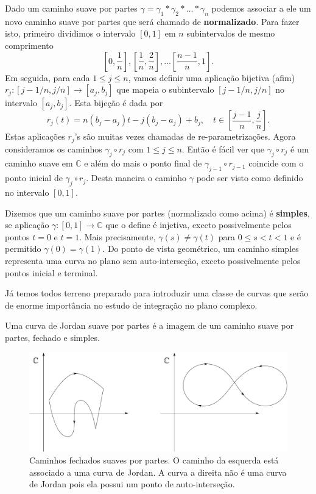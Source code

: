 Dado um caminho suave por partes $\gamma= \gamma_1*\gamma_2*\ldots*\gamma_n$
podemos associar a ele um novo caminho suave por partes 
que será chamado de {\bf normalizado}.
Para fazer isto, primeiro dividimos o intervalo $[0,1]$ em $n$ subintervalos de
mesmo comprimento
\[
\left[0,\frac{1}{n} \right],
\left[\frac{1}{n},\frac{2}{n} \right],
\ldots
\left[\frac{n-1}{n},1 \right].
\]
Em seguida, para cada $1\leqslant j\leqslant n$, vamos definir uma aplicação bijetiva (afim) 
$r_{j}:[j-1/n,j/n]\to [a_j,b_j]$ que mapeia o subintervalo $[j-1/n,j/n]$ no intervalo $[a_j,b_j]$. 
Esta bijeção é dada por 
\[
r_j(t) = n(b_j-a_j)t-j(b_j-a_j)+b_j, \quad t\in\left[\frac{j-1}{n},\frac{j}{n}\right].
\]
Estas aplicações $r_j$'s são muitas vezes chamadas de re-parametrizações. 
Agora consideramos os caminhos $\gamma_{j}\circ r_j$ com $1\leqslant j\leqslant n$.
Então é fácil ver que $\gamma_{j}\circ r_j$ é um caminho suave em $\mathbb{C}$ e além do 
mais o ponto final de $\gamma_{j-1}\circ r_{j-1}$ coincide com o ponto inicial de 
$\gamma_{j}\circ r_j$. Desta maneira o caminho $\gamma$ pode ser visto como definido 
no intervalo $[0,1]$. 

Dizemos que um caminho suave por partes (normalizado como acima) 
é {\bf simples}, se aplicação $\gamma:[0,1]\to\mathbb{C}$ que o define
é injetiva, exceto possivelmente pelos pontos $t=0$ e $t=1$. Mais precisamente, $\gamma(s)\neq \gamma(t)$
para $0\leqslant s<t<1$ e é permitido $\gamma(0)=\gamma(1)$. 
Do ponto de vista geométrico, um caminho simples representa uma curva no plano sem 
auto-interseção, exceto possivelmente pelos pontos inicial e terminal. 


Já temos todos terreno preparado para introduzir uma classe de curvas 
que serão de enorme importância no estudo de integração no plano 
complexo. 

\begin{definicao}
\label{def-curva-jordan}
Uma curva de Jordan suave por partes é a imagem de um caminho suave por partes, fechado e simples. 
\end{definicao}


\begin{figure}[h]
\centering
\includegraphics[scale=0.4]{Figuras/fig-curvas-fechadas}
\caption{Caminhos fechados suaves por partes. O caminho da esquerda está associado a uma curva de Jordan. A curva a direita não é uma curva de Jordan pois ela possui um ponto de auto-interseção.}
\label{fig-curvas-fechadas}
\end{figure}



